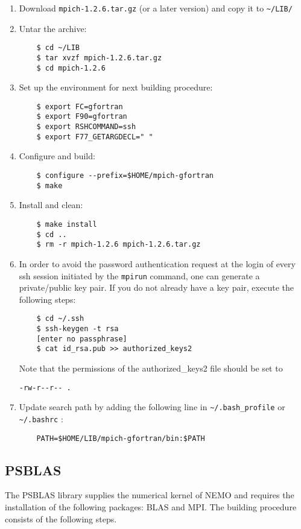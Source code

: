 \documentclass[a4paper,12pt]{article}%
\begin{document}
\begin{enumerate}
\item Download \verb+mpich-1.2.6.tar.gz+ (or a later version) and
  copy it to \verb+~/LIB/+
\item Untar the archive:
  \begin{Verbatim}
    $ cd ~/LIB
    $ tar xvzf mpich-1.2.6.tar.gz
    $ cd mpich-1.2.6
  \end{Verbatim}
\item Set up the environment for next building procedure:
  \begin{Verbatim}
    $ export FC=gfortran
    $ export F90=gfortran
    $ export RSHCOMMAND=ssh
    $ export F77_GETARGDECL=" "
  \end{Verbatim}
\item Configure and build:
  \begin{Verbatim}
    $ configure --prefix=$HOME/mpich-gfortran
    $ make
  \end{Verbatim}
\item Install and clean:
  \begin{Verbatim}
    $ make install
    $ cd ..
    $ rm -r mpich-1.2.6 mpich-1.2.6.tar.gz
  \end{Verbatim}
\item In order to avoid the password authentication request at the
  login of every ssh session initiated by the \verb+mpirun+
  command, one can generate a private/public key pair.  If you do not already
  have a key pair, 
execute the following steps:
  \begin{Verbatim}
    $ cd ~/.ssh
    $ ssh-keygen -t rsa
    [enter no passphrase]
    $ cat id_rsa.pub >> authorized_keys2
  \end{Verbatim}

Note that the permissions of the authorized\_keys2 file should be set to 

 \verb+-rw-r--r-- .+
\item Update search path by adding the following line in
  \verb+~/.bash_profile+ or \verb+~/.bashrc+ :
  \begin{Verbatim}
    PATH=$HOME/LIB/mpich-gfortran/bin:$PATH
  \end{Verbatim}
\end{enumerate}

\subsection{PSBLAS}

The PSBLAS library supplies the numerical kernel of NEMO and requires
the installation of the following packages: BLAS and MPI. The
building procedure consists of the following steps.
\end{document}
